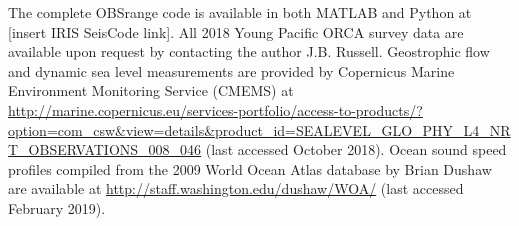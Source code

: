 The complete OBSrange code is available in both MATLAB and Python at [insert IRIS SeisCode link]. All 2018 Young Pacific ORCA survey data are available upon request by contacting the author J.B. Russell. Geostrophic flow and dynamic sea level measurements are provided by Copernicus
Marine Environment Monitoring Service (CMEMS) at \href{http://marine.copernicus.eu/services-portfolio/access-to-products/?option=com_csw\&view=details\&product_id=SEALEVEL_GLO_PHY_L4_NRT_OBSERVATIONS_008_046}{http://marine.copernicus.eu/services-portfolio/access-to-products/?option=com\_csw\&view=details\&product\_id=SEALEVEL\_GLO\_PHY\_L4\_NRT\_OBSERVATIONS\_008\_046} (last accessed October 2018). Ocean sound speed profiles compiled from the 2009 World Ocean Atlas database by Brian Dushaw are available at \href{http://staff.washington.edu/dushaw/WOA/}{http://staff.washington.edu/dushaw/WOA/} (last accessed February 2019).